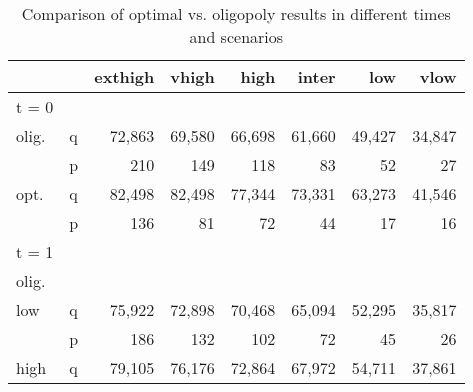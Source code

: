 \begin{table}
\centering
\caption{Comparison of optimal vs. oligopoly results in different times and scenarios}
\begin{tabular}{llrrrrrr}
\hline
\hline
           &            &    exthigh &      vhigh &       high &      inter &        low &       vlow \\
\hline
     t = 0 &            &            &            &            &            &            &            \\
\hline
 olig. &          q &     72,863 &     69,580 &     66,698 &     61,660 &     49,427 &     34,847 \\

           &          p &        210 &        149 &        118 &         83 &         52 &         27 \\
\hline
   opt. &          q &     82,498 &     82,498 &     77,344 &     73,331 &     63,273 &     41,546 \\

           &          p &        136 &         81 &         72 &         44 &         17 &         16 \\
\hline
\hline
     t = 1 &            &            &            &            &            &            &            \\

 olig. &            &            &            &            &            &            &            \\

       low &          q &     75,922 &     72,898 &     70,468 &     65,094 &     52,295 &     35,817 \\

           &          p &        186 &        132 &        102 &         72 &         45 &         26 \\

      high &          q &     79,105 &     76,176 &     72,864 &     67,972 &     54,711 &     37,861 \\


\end{tabular}
\end{table}
